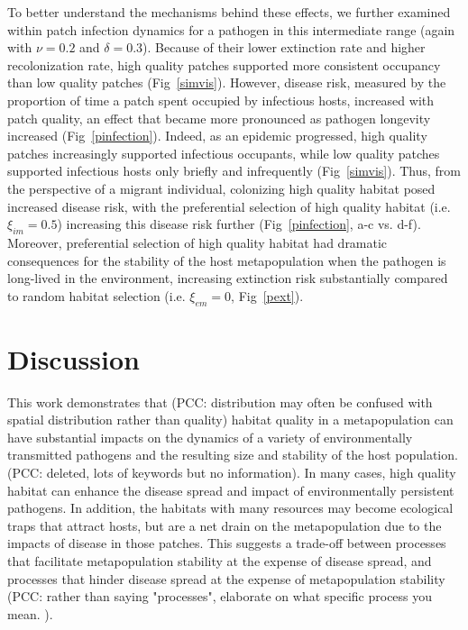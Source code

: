 \documentclass{article}
\begin{document}
To better understand the mechanisms behind these effects, we further examined within patch infection dynamics for a pathogen in this intermediate range (again with $\nu = 0.2$ and $\delta = 0.3$).  
Because of their lower extinction rate and higher recolonization rate, high quality patches supported more consistent occupancy than low quality patches (Fig~\ref{simvis}).  
However, disease risk, measured by the proportion of time a patch spent occupied by infectious hosts, increased with patch quality, an effect that became more pronounced as pathogen longevity increased (Fig~\ref{pinfection}).
Indeed, as an epidemic progressed, high quality patches increasingly supported infectious occupants, while low quality patches supported infectious hosts only briefly and infrequently (Fig~\ref{simvis}).  
Thus, from the perspective of a migrant individual, colonizing high quality habitat posed increased disease risk, with the preferential selection of high quality habitat (i.e. $\xi_{im} = 0.5$) increasing this disease risk further (Fig~\ref{pinfection}, a-c vs. d-f).
Moreover, preferential selection of high quality habitat had dramatic consequences for the stability of the host metapopulation when the pathogen is long-lived in the environment, increasing extinction risk substantially compared to random habitat selection (i.e. $\xi_{em} = 0$, Fig~\ref{pext}).

\section{Discussion}
\label{discussion} 

This work demonstrates that (PCC: distribution may often be confused with spatial distribution rather than quality) habitat quality in a metapopulation can have substantial impacts on the dynamics of a variety of environmentally transmitted pathogens and the resulting size and stability of the host population. (PCC: deleted, lots of keywords but no information).  In many cases, high quality habitat can enhance the disease spread and impact of environmentally persistent pathogens.  In addition, the habitats with many resources may become ecological traps that attract hosts, but are a net drain on the metapopulation due to the impacts of disease in those patches. This suggests a trade-off between processes that facilitate metapopulation stability at the expense of disease spread, and processes that hinder disease spread at the expense of metapopulation stability (PCC: rather than saying "processes", elaborate on what specific process you mean. ).
\end{document}
